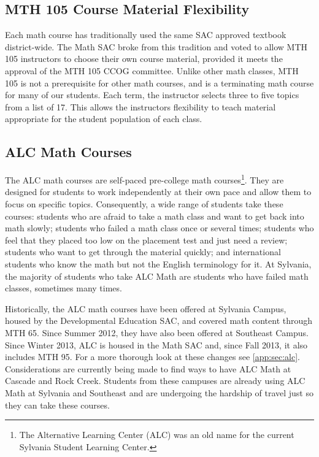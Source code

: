 \subsection{MTH 105 Course Material Flexibility}
Each math course has traditionally used the same SAC approved textbook
district-wide.  The Math SAC broke from this tradition and voted to allow MTH
105 instructors to choose their own course material, provided it meets the
approval of the MTH 105 CCOG committee.  Unlike other math classes, MTH 105 is not a
prerequisite for other math courses, and is a terminating math course for many
of our students.  Each term, the instructor selects three to five topics from a
list of 17.  This allows the instructors flexibility to teach material
appropriate for the student population of each class.

\subsection{ALC Math Courses}
The ALC math courses are self-paced pre-college math courses\footnote{The Alternative
Learning Center (ALC) was an old name for the current Sylvania Student Learning Center.}.
They are designed for students to work independently at their own pace and allow
them to focus on specific topics.  Consequently, a wide range of students take
these courses: students who are afraid to take a math class and want to get back
into math slowly; students who failed a math class once or several times; students
who feel that they placed too low on the placement test and just need a review;
students who want to get through the material quickly; and international
students who know the math but not the English terminology for it.  At Sylvania,
the majority of students who take ALC Math are students who have failed math classes,
sometimes many times.

Historically, the ALC math courses have been offered at Sylvania Campus, housed
by the Developmental Education SAC, and covered math content through MTH 65.
Since Summer 2012, they have also been offered at Southeast Campus.  Since
Winter 2013, ALC is housed in the Math SAC and, since Fall 2013, it also
includes MTH 95. For a more thorough look at these changes see
\vref{app:sec:alc}. Considerations are currently being made to find ways to have
ALC Math at Cascade and Rock Creek.  Students from these campuses are
already using ALC Math at Sylvania and Southeast and are undergoing the hardship
of travel just so they can take these courses.

